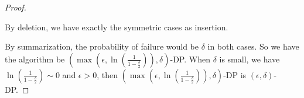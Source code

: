 \documentclass[11pt]{article}
\begin{document}
\begin{proof}
\begin{itemize}
 By deletion, we have exactly the symmetric cases as insertion.


\end{itemize}
By summarization, the probability of failure would be $\delta$ in both cases. So we have the algorithm be $(\max(\epsilon, \ln(\frac{1}{1 - \frac{\delta}{2}})), \delta)$-DP. When $\delta$ is small, we have $\ln(\frac{1}{1 - \frac{\delta}{2}}) \sim 0$ and $\epsilon > 0$, then $(\max(\epsilon, \ln(\frac{1}{1 - \frac{\delta}{2}})), \delta)$-DP is $(\epsilon, \delta)$-DP.
\end{proof}
\end{document}
